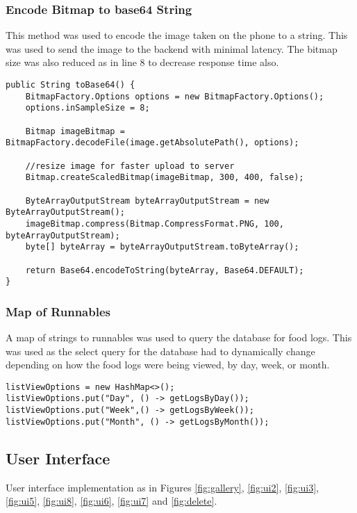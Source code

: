 \subsubsection*{Encode Bitmap to base64 String}
This method was used to encode the image taken on the phone to a string.
This was used to send the image to the backend with minimal latency.
The bitmap size was also reduced as in line 8 to decrease response time also.
\begin{lstlisting}[style=Java]
public String toBase64() {
    BitmapFactory.Options options = new BitmapFactory.Options();
    options.inSampleSize = 8;

    Bitmap imageBitmap = BitmapFactory.decodeFile(image.getAbsolutePath(), options);

    //resize image for faster upload to server
    Bitmap.createScaledBitmap(imageBitmap, 300, 400, false);
    
    ByteArrayOutputStream byteArrayOutputStream = new ByteArrayOutputStream();
    imageBitmap.compress(Bitmap.CompressFormat.PNG, 100, byteArrayOutputStream);
    byte[] byteArray = byteArrayOutputStream.toByteArray();

    return Base64.encodeToString(byteArray, Base64.DEFAULT);
}
\end{lstlisting}

\subsubsection*{Map of Runnables}
A map of strings to runnables was used to query the database for food logs.
This was used as the select query for the database had to dynamically change depending on how the food logs were being viewed, by day, week, or month.
\begin{lstlisting}[style=Java]
listViewOptions = new HashMap<>();
listViewOptions.put("Day", () -> getLogsByDay());
listViewOptions.put("Week",() -> getLogsByWeek());
listViewOptions.put("Month", () -> getLogsByMonth());
\end{lstlisting}

\subsection*{User Interface}
User interface implementation as in Figures \ref{fig:gallery}, \ref{fig:ui2}, \ref{fig:ui3}, \ref{fig:ui5}, \ref{fig:ui8}, \ref{fig:ui6}, \ref{fig:ui7} and \ref{fig:delete}.

